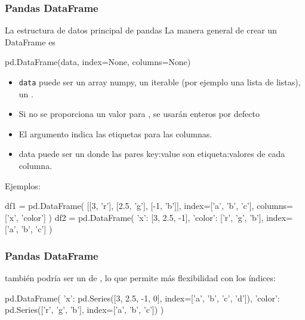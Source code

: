 \documentclass[9pt]{beamer}
\begin{document}
\begin{frame}[fragile]
  \frametitle{Pandas DataFrame}
  \begin{block}{La estructura de datos principal de pandas}
      La manera general de crear un DataFrame es
  \begin{pyverbatim}
    pd.DataFrame(data, index=None, columns=None)
  \end{pyverbatim}
  \end{block}
  \begin{itemize}
  \item   {\tt data} puede ser un array numpy, un iterable (por ejemplo una lista de listas), un .
  \item Si no se proporciona un valor para , se usarán enteros por defecto
  \item El argumento  indica las etiquetas para las columnas.
  \item data puede ser un  donde las pares key:value son etiqueta:valores de cada columna.
  \end{itemize}\pause
{\footnotesize  Ejemplos:
  \begin{pyblock}
df1 = pd.DataFrame(
        [[3, 'r'],
         [2.5, 'g'],
         [-1, 'b']],
        index=['a', 'b', 'c'],
        columns=['x', 'color']
)
df2 = pd.DataFrame(
        {'x': [3, 2.5, -1],
         'color': ['r', 'g', 'b']},
        index=['a', 'b', 'c']
)
  \end{pyblock}
  }
\end{frame}
\begin{frame}[fragile]
  \frametitle{Pandas DataFrame}
   también podría ser un  de , lo que permite más flexibilidad con los índices: 
  \begin{pyconsole}
pd.DataFrame(
  {'x': pd.Series([3, 2.5, -1, 0], index=['a', 'b', 'c', 'd']),
   'color': pd.Series(['r', 'g', 'b'], index=['a', 'b', 'c'])}
)
  \end{pyconsole}
\end{frame}
\end{document}
